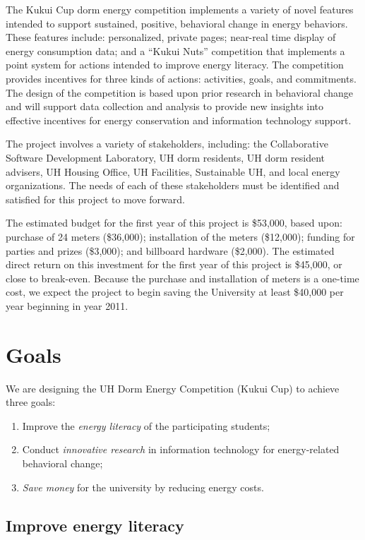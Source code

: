 \documentclass[11pt]{article}
\begin{document}
The Kukui Cup dorm energy competition implements a variety of novel
features intended to support sustained, positive, behavioral change in
energy behaviors.  These features include: personalized, private pages;
near-real time display of energy consumption data; and a ``Kukui Nuts''
competition that implements a point system for actions intended to improve
energy literacy.  The competition provides incentives for three kinds of
actions: activities, goals, and commitments.  The design of the competition
is based upon prior research in behavioral change and will support data
collection and analysis to provide new insights into effective incentives
for energy conservation and information technology support.

The project involves a variety of stakeholders, including: the
Collaborative Software Development Laboratory, UH dorm residents, UH dorm
resident advisers, UH Housing Office, UH Facilities, Sustainable UH, and
local energy organizations.  The needs of each of these stakeholders must
be identified and satisfied for this project to move forward.

The estimated budget for the first year of this project is \$53,000, based
upon: purchase of 24 meters (\$36,000); installation of the meters
(\$12,000); funding for parties and prizes (\$3,000); and 
billboard hardware (\$2,000).  The estimated direct return on this investment
for the first year of this project is \$45,000, or close to break-even.
Because the purchase and installation of meters is a one-time cost, we
expect the project to begin saving the University at least \$40,000 per
year beginning in year 2011.  


\newpage
\section{Goals}

We are designing the UH Dorm Energy Competition (Kukui Cup) to achieve three goals:
\begin{enumerate}
\item Improve the {\em energy literacy} of the participating students;
\item Conduct {\em innovative research} in information technology for
  energy-related behavioral change;
\item {\em Save money} for the university by reducing energy costs.
\end{enumerate}

\subsection{Improve energy literacy}
\end{document}
